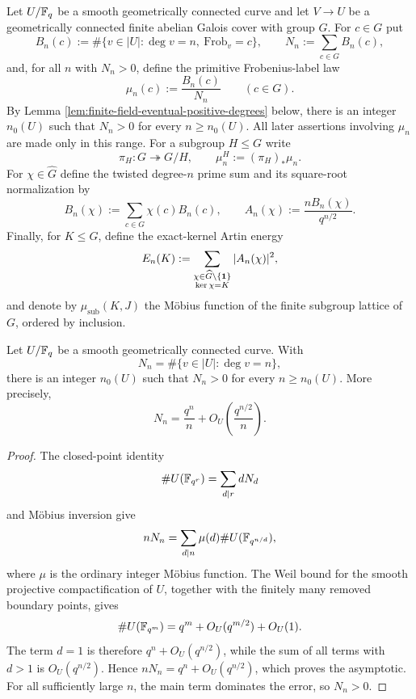 \begin{definition}\label{def:finite-field-quotient-notation}
Let \(U/\mathbb{F}_q\) be a smooth geometrically connected curve and let \(V\to U\) be a geometrically connected finite \etale{} abelian Galois cover with group \(G\). For \(c\in G\) put
\[
B_n(c):=\#\{v\in |U|:\deg v=n,\ \mathrm{Frob}_v=c\},
\qquad
N_n:=\sum_{c\in G}B_n(c),
\]
and, for all \(n\) with \(N_n>0\), define the primitive Frobenius-label law
\[
\mu_n(c):=\frac{B_n(c)}{N_n}\qquad(c\in G).
\]
By Lemma \ref{lem:finite-field-eventual-positive-degrees} below, there is an integer \(n_0(U)\) such that \(N_n>0\) for every \(n\ge n_0(U)\). All later assertions involving \(\mu_n\) are made only in this range.
For a subgroup \(H\le G\) write
\[
\pi_H:G\twoheadrightarrow G/H,
\qquad
\mu_n^H:=(\pi_H)_\ast\mu_n.
\]
For \(\chi\in\widehat G\) define the twisted degree-\(n\) prime sum and its square-root normalization by
\[
B_n(\chi):=\sum_{c\in G}\chi(c)B_n(c),
\qquad
A_n(\chi):=\frac{nB_n(\chi)}{q^{n/2}}.
\]
Finally, for \(K\le G\), define the exact-kernel Artin energy
\[
E_n(K):=
\sum_{\substack{\chi\in\widehat G\setminus\{\mathbf{1}\}\\ \ker\chi=K}}
|A_n(\chi)|^2,
\]
and denote by \(\mu_{\mathrm{sub}}(K,J)\) the M\"obius function of the finite subgroup lattice of \(G\), ordered by inclusion.
\end{definition}

\begin{lemma}\label{lem:finite-field-eventual-positive-degrees}
Let \(U/\mathbb{F}_q\) be a smooth geometrically connected curve. With
\[
N_n=\#\{v\in |U|:\deg v=n\},
\]
there is an integer \(n_0(U)\) such that \(N_n>0\) for every \(n\ge n_0(U)\). More precisely,
\[
N_n=\frac{q^n}{n}+O_U\!\left(\frac{q^{n/2}}{n}\right).
\]
\end{lemma}

\begin{proof}
The closed-point identity
\[
\#U(\mathbb{F}_{q^r})=\sum_{d\mid r}dN_d
\]
and M\"obius inversion give
\[
nN_n=\sum_{d\mid n}\mu(d)\#U(\mathbb{F}_{q^{n/d}}),
\]
where \(\mu\) is the ordinary integer M\"obius function. The Weil bound for the smooth projective compactification of \(U\), together with the finitely many removed boundary points, gives
\[
\#U(\mathbb{F}_{q^m})=q^m+O_U(q^{m/2})+O_U(1).
\]
The term \(d=1\) is therefore \(q^n+O_U(q^{n/2})\), while the sum of all terms with \(d>1\) is \(O_U(q^{n/2})\). Hence \(nN_n=q^n+O_U(q^{n/2})\), which proves the asymptotic. For all sufficiently large \(n\), the main term dominates the error, so \(N_n>0\).
\end{proof}

